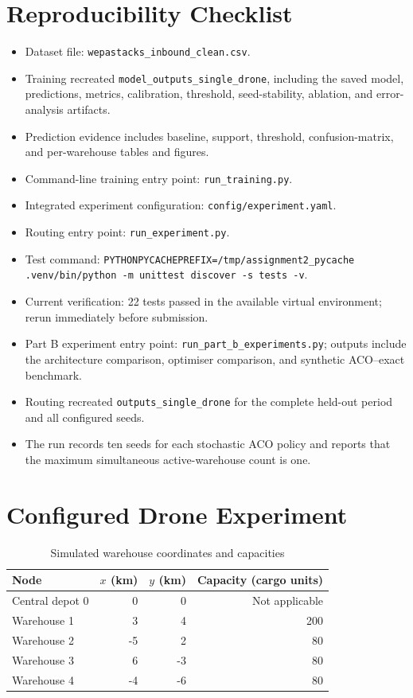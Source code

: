 \documentclass[10pt]{article}
\newcommand{\code}[1]{\nolinkurl{#1}}
\begin{document}
\section{Reproducibility Checklist}

\begin{itemize}
  \item Dataset file: \code{wepastacks_inbound_clean.csv}.
  \item Training recreated \code{model_outputs_single_drone}, including the saved model, predictions, metrics, calibration, threshold, seed-stability, ablation, and error-analysis artifacts.
  \item Prediction evidence includes baseline, support, threshold, confusion-matrix, and per-warehouse tables and figures.
  \item Command-line training entry point: \code{run_training.py}.
  \item Integrated experiment configuration: \code{config/experiment.yaml}.
  \item Routing entry point: \code{run_experiment.py}.
  \item Test command: \code{PYTHONPYCACHEPREFIX=/tmp/assignment2_pycache .venv/bin/python -m unittest discover -s tests -v}.
  \item Current verification: 22 tests passed in the available virtual environment; rerun immediately before submission.
  \item Part B experiment entry point: \code{run_part_b_experiments.py}; outputs include the architecture comparison, optimiser comparison, and synthetic ACO--exact benchmark.
  \item Routing recreated \code{outputs_single_drone} for the complete held-out period and all configured seeds.
  \item The run records ten seeds for each stochastic ACO policy and reports that the maximum simultaneous active-warehouse count is one.
\end{itemize}

\appendix
\section{Configured Drone Experiment}

\begin{table}[H]
\centering
\caption{Simulated warehouse coordinates and capacities}
\small
\begin{tabular}{lrrr}
\toprule
Node & $x$ (km) & $y$ (km) & Capacity (cargo units) \\
\midrule
Central depot 0 & 0 & 0 & Not applicable \\
Warehouse 1 & 3 & 4 & 200 \\
Warehouse 2 & -5 & 2 & 80 \\
Warehouse 3 & 6 & -3 & 80 \\
Warehouse 4 & -4 & -6 & 80 \\
\bottomrule
\end{tabular}
\end{table}
\end{document}
